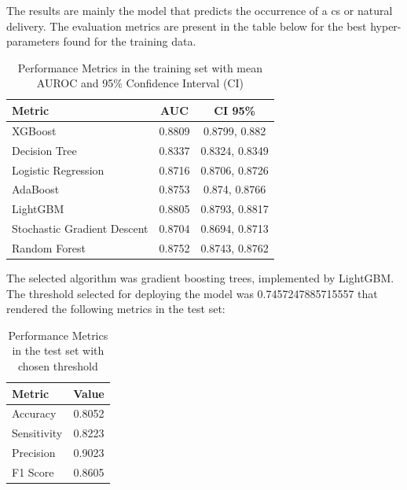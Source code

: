 The results are mainly the model that predicts the occurrence of a \ac{cs} or natural delivery. 
The evaluation metrics are present in the table below for the best hyper-parameters found for the training data.

\begin{table}[htbp]
  \centering
  \caption{Performance Metrics in the training set with mean AUROC and 95\% Confidence Interval (CI)}
  \label{tab:performance_metrics_auc}
  \renewcommand{\arraystretch}{1.5} %
  \setlength{\tabcolsep}{12pt} %
  \begin{tabular}{lcc}
    \hline
    \textbf{Metric} & \textbf{AUC} & \textbf{CI 95\%} \\
    \hline
    XGBoost & 0.8809 & 0.8799, 0.882 \\  
    Decision Tree & 0.8337 & 0.8324, 0.8349 \\
    Logistic Regression & 0.8716 & 0.8706, 0.8726 \\
    AdaBoost & 0.8753 & 0.874, 0.8766 \\ 
    LightGBM & 0.8805 & 0.8793, 0.8817 \\ 
    Stochastic Gradient Descent & 0.8704 & 0.8694, 0.8713 \\ 
    Random Forest & 0.8752 & 0.8743, 0.8762 \\  
    \hline
  \end{tabular}
\end{table}



The selected algorithm was gradient boosting trees, implemented by LightGBM\cite{lightgbm}. The threshold selected for deploying the model was 0.7457247885715557 that rendered the following metrics in the test set:

\begin{table}[htbp]
  \centering
  \caption{Performance Metrics in the test set with chosen threshold}
  \label{tab:performance_metrics}
  \renewcommand{\arraystretch}{1.5} %
  \setlength{\tabcolsep}{12pt} %
  \begin{tabular}{lc}
    \hline
    \textbf{Metric} & \textbf{Value} \\
    \hline
    Accuracy & 0.8052 \\
    Sensitivity & 0.8223 \\
    Precision & 0.9023 \\
    F1 Score & 0.8605 \\
    \hline
  \end{tabular}
\end{table}




